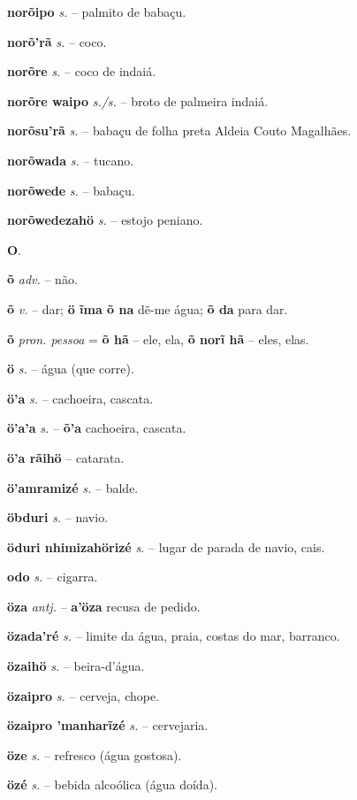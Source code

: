 \textbf{norõipo} \textit{s.} -- palmito de babaçu.

\textbf{norõ'rã} \textit{s.} -- coco.

\textbf{norõre} \textit{s.} -- coco de indaiá.

\textbf{norõre waipo} \textit{s./s.} -- broto de palmeira indaiá.

\textbf{norõsu'rã} \textit{s.} -- babaçu de folha preta  Aldeia Couto Magalhães.

\textbf{norõwada} \textit{s.} -- tucano.

\textbf{norõwede} \textit{s.} -- babaçu.

\textbf{norõwedezahö} \textit{s.} -- estojo peniano.



\textbf{O}.



\textbf{õ} \textit{adv.} -- não.

\textbf{õ} \textit{v.} -- dar; \textbf{ö ĩma õ na} dẽ-me água; \textbf{õ da} para dar.

\textbf{õ} \textit{pron. pessoa} = \textbf{õ hã} -- ele, ela, \textbf{õ norĩ hã} -- eles, elas.

\textbf{ö} \textit{s.} -- água (que corre).

\textbf{ö'a} \textit{s.} -- cachoeira, cascata.

\textbf{ö'a'a} \textit{s.} -- \textbf{õ'a} cachoeira, cascata.

\textbf{ö'a rãihö} -- catarata.

\textbf{ö'amramizé} \textit{s.} -- balde.

\textbf{öbduri} \textit{s.} -- navio.

\textbf{öduri nhimizahörizé} \textit{s.} -- lugar de parada de navio, cais.

\textbf{odo} \textit{s.} -- cigarra.

\textbf{öza} \textit{antj.} -- \textbf{a'öza} recusa de pedido.

\textbf{özada'ré} \textit{s.} -- limite da água, praia, costas do mar, barranco.

\textbf{özaihö} \textit{s.} -- beira-d'água.

\textbf{özaipro} \textit{s.} -- cerveja, chope.

\textbf{özaipro 'manharĩzé} \textit{s.} -- cervejaria.

\textbf{öze} \textit{s.} -- refresco (água gostosa).

\textbf{özé} \textit{s.} -- bebida alcoólica (água doída).

